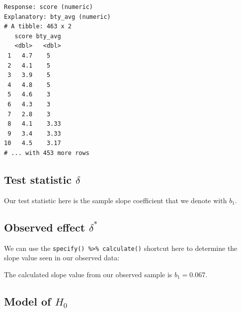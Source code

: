 \documentclass[12pt,]{krantz}
\makeatletter
\newenvironment{Shaded}{\begin{snugshade}}{\end{snugshade}}
\newcommand{\KeywordTok}[1]{\textcolor[rgb]{0.27,0.27,0.27}{\textbf{#1}}}
\newcommand{\DataTypeTok}[1]{\textcolor[rgb]{0.27,0.27,0.27}{#1}}
\newcommand{\StringTok}[1]{\textcolor[rgb]{0.5,0.5,0.5}{#1}}
\newcommand{\OperatorTok}[1]{\textcolor[rgb]{0.43,0.43,0.43}{\textbf{#1}}}
\newcommand{\NormalTok}[1]{#1}
\newenvironment{kframe}{%
\medskip{}
\setlength{\fboxsep}{.8em}
 \def\at@end@of@kframe{}%
 \ifinner\ifhmode%
  \def\at@end@of@kframe{\end{minipage}}%
  \begin{minipage}{\columnwidth}%
 \fi\fi%
 \def\FrameCommand##1{\hskip\@totalleftmargin \hskip-\fboxsep
 \colorbox{shadecolor}{##1}\hskip-\fboxsep
     \hskip-\linewidth \hskip-\@totalleftmargin \hskip\columnwidth}%
 \MakeFramed {\advance\hsize-\width
   \@totalleftmargin\z@ \linewidth\hsize
   \@setminipage}}%
 {\par\unskip\endMakeFramed%
 \at@end@of@kframe}
\renewenvironment{Shaded}{\begin{kframe}}{\end{kframe}}
\theoremstyle{definition}
\theoremstyle{definition}
\theoremstyle{definition}
\theoremstyle{remark}
\makeatother
\begin{document}
\begin{Shaded}
\end{Shaded}

\begin{verbatim}
Response: score (numeric)
Explanatory: bty_avg (numeric)
# A tibble: 463 x 2
   score bty_avg
   <dbl>   <dbl>
 1   4.7    5   
 2   4.1    5   
 3   3.9    5   
 4   4.8    5   
 5   4.6    3   
 6   4.3    3   
 7   2.8    3   
 8   4.1    3.33
 9   3.4    3.33
10   4.5    3.17
# ... with 453 more rows
\end{verbatim}

\subsection{\texorpdfstring{Test statistic
\(\delta\)}{Test statistic \textbackslash{}delta}}\label{test-statistic-delta-1}

Our test statistic here is the sample slope coefficient that we denote
with \(b_1\).

\subsection{\texorpdfstring{Observed effect
\(\delta^*\)}{Observed effect \textbackslash{}delta\^{}*}}\label{observed-effect-delta-1}

We can use the \texttt{specify()\ \%\textgreater{}\%\ calculate()}
shortcut here to determine the slope value seen in our observed data:

\begin{Shaded}
\end{Shaded}

The calculated slope value from our observed sample is \(b_1 = 0.067\).

\subsection{\texorpdfstring{Model of
\(H_0\)}{Model of H\_0}}\label{model-of-h_0-1}
\end{document}
